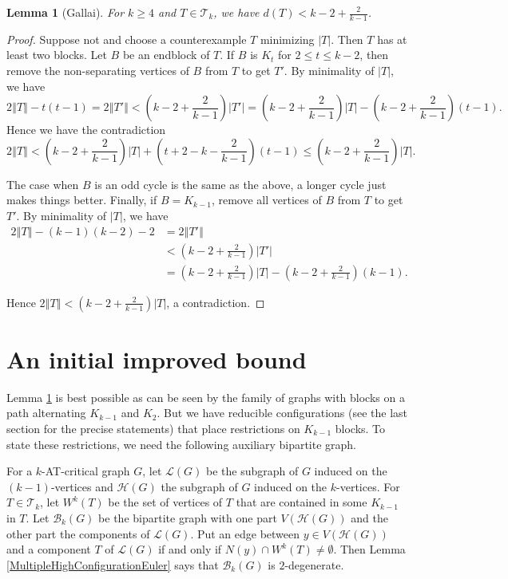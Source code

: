 \documentclass[12pt]{article}
\theoremstyle{plain}
\newtheorem{lem}[thm]{Lemma}
\theoremstyle{definition}
\theoremstyle{remark}
\newcommand{\fancy}[1]{\mathcal{#1}}
\newcommand{\T}{\fancy{T}}
\newcommand{\B}{\fancy{B}}
\renewcommand{\L}{\fancy{L}}
\newcommand{\HH}{\fancy{H}}
\newcommand{\size}[1]{\left\Vert#1\right\Vert}
\newcommand{\parens}[1]{\left( #1 \right)}
\begin{document}
\begin{lem}[Gallai]\label{BasicGallaiTreeBound}
	For $k \ge 4$ and $T \in \T_k$, we have $d(T) < k-2 + \frac{2}{k-1}$.
\end{lem}
\begin{proof}
	Suppose not and choose a counterexample $T$ minimizing $|T|$.  Then $T$ has at least two blocks.  Let $B$ be an endblock of $T$.  If $B$ is $K_t$ for $2 \le t \le k-2$, then remove the non-separating vertices of $B$ from $T$ to get $T'$.  By minimality of $|T|$, we have 
	\[2\size{T} - t(t-1) = 2\size{T'} < \parens{k-2 + \frac{2}{k-1}}|T'| = \parens{k-2 + \frac{2}{k-1}}|T| - \parens{k-2 + \frac{2}{k-1}}(t-1).\]
	Hence we have the contradiction
	\[2\size{T} < \parens{k-2 + \frac{2}{k-1}}|T| + (t+2 -k - \frac{2}{k-1})(t-1) \le \parens{k-2 + \frac{2}{k-1}}|T|.\]
	
	The case when $B$ is an odd cycle is the same as the above, a longer cycle just makes things better.  Finally, if $B = K_{k-1}$, remove all vertices of $B$ from $T$ to get $T'$. By minimality of $|T|$, we have 
	\begin{align*}
	  2\size{T} - (k-1)(k-2) - 2 &= 2\size{T'}\\
	  &< \parens{k-2 + \frac{2}{k-1}}|T'|\\
	  &= \parens{k-2 + \frac{2}{k-1}}|T| - \parens{k-2 + \frac{2}{k-1}}(k-1).
	\end{align*}

	Hence $2\size{T} < \parens{k-2 + \frac{2}{k-1}}|T|$, a contradiction.
\end{proof}

\section{An initial improved bound}
Lemma \ref{BasicGallaiTreeBound} is best possible as can be seen by the family of graphs with blocks on a path alternating $K_{k-1}$ and $K_2$.  But we have reducible configurations (see the last section for the precise statements) that place restrictions on $K_{k-1}$ blocks. To state these restrictions, we need the following auxiliary bipartite graph. 

For a $k$-AT-critical graph $G$, let $\L(G)$ be the subgraph of $G$ induced on the $(k-1)$-vertices and $\HH(G)$ the subgraph of $G$ induced on the $k$-vertices.   For $T \in \T_k$, let $W^k(T)$ be the set of vertices of $T$ that are contained in some $K_{k-1}$ in $T$.  Let $\B_k(G)$ be the bipartite graph with one part $V(\HH(G))$ and the other part the components of $\L(G)$.  Put an edge between $y \in V(\HH(G))$ and a component $T$ of $\L(G)$ if and only if $N(y) \cap W^k(T) \ne \emptyset$.  Then Lemma \ref{MultipleHighConfigurationEuler} says that $\B_k(G)$ is $2$-degenerate.
\end{document}
